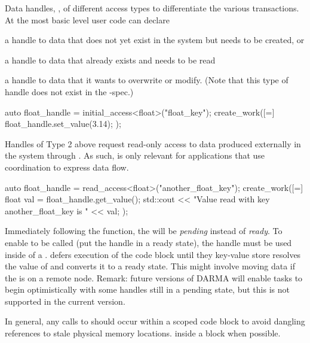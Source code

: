 Data \glspl{handle},
, 
  of different access types to differentiate the various transactions. 
At the most basic level user code can declare 
\begin{compactenum}
  \item a \gls{handle} to data that does not yet exist in the system
but needs to be created, or
\item a \gls{handle} to data that already exists and needs to
be read
\item a \gls{handle} to data that it wants to overwrite or modify. 
  (Note that this type of handle does not exist in the \specVersion-spec.)
\end{compactenum}


\begin{CppCode}
auto float_handle = initial_access<float>("float_key");
create_work([=]{
  float_handle.set_value(3.14);
});
\end{CppCode}

Handles of Type 2 above request read-only access to data produced externally in the system through . 
As such,  is only relevant for applications that use coordination to express data flow.
\begin{CppCode}
auto float_handle = read_access<float>("another_float_key");
create_work([=]{
  float val = float_handle.get_value();
  std::cout << "Value read with key another_float_key is " << val;  
});
\end{CppCode}

Immediately following the  function, the \ahandle will be \emph{pending} instead of \emph{ready}.
To enable  to be called (put the handle in a ready state), the handle must be used inside of a .
\cwork defers execution of the code block until they key-value store resolves the value of  and converts it to a ready state.
This might involve moving data if the  is on a remote node.
Remark: future versions of DARMA will enable tasks to begin optimistically with some handles still in a pending state, but this is not supported in the current version.

In general, any calls to  should occur 
within a scoped code block to avoid dangling references to stale physical memory locations.
inside a  block when possible.


